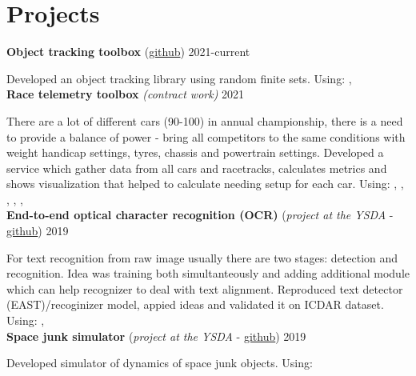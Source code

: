 \section*{\sectionformat Projects}
\textbf{Object tracking toolbox} (\href{https://github.com/neer201/Multi-Object-Tracking-for-Automotive-Systems-in-python}{github}) \hfill 2021-current
\par
Developed an object tracking library using random finite sets.
Using: , 
\\
% 
\textbf{Race telemetry toolbox} \textit{(contract work)} \hfill 2021
\par
There are a lot of different cars (90-100) in annual championship, there is a need to provide a balance of power -  bring all competitors to the same conditions with weight handicap settings, tyres, chassis and powertrain settings.
Developed a service which gather data from all cars and racetracks, calculates metrics and shows visualization that helped to calculate needing setup for each car.
Using: , , , , , 
\\
\textbf{End-to-end optical character recognition (OCR)} (\textit{project at the YSDA} - \href{https://github.com/neer201/end2end_OCR}{github})  \hfill 2019
\par
For text recognition from raw image usually there are two stages: detection and recognition. Idea was training both simultanteously and adding additional module which can help recognizer to deal with text alignment.
Reproduced text detector (EAST)/recoginizer model, appied ideas and validated it on ICDAR dataset.
Using: , 
% 
\\
\textbf{Space junk simulator} (\textit{project at the YSDA} - \href{https://github.com/neer201/space_junk_simulator}{github})   \hfill 2019
\par
Developed simulator of dynamics of space junk objects.
Using: 
